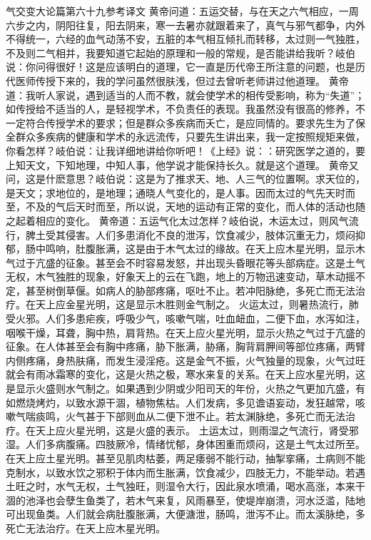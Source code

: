 \documentclass[12pt,UTF8]{ctexbook}
\begin{document}
气交变大论篇第六十九参考译文
黄帝问道：五运交替，与在天之六气相应，一周六步之内，阴阳往复，阳去阴来，寒一去暑亦就跟着来了，真气与邪气都争，内外不得统一，六经的血气动荡不安，五脏的本气相互倾扎而转移，太过则一气独胜，不及则二气相并，我要知道它起始的原理和一般的常规，是否能讲给我听？岐伯说：你问得很好！这是应该明白的道理，它一直是历代帝王所注意的问题，也是历代医师传授下来的，我的学问虽然很肤浅，但过去曾听老师讲过他道理。
黄帝道：我听人家说，遇到适当的人而不教，就会使学术的相传受影响，称为“失道”；如传授给不适当的人，是轻视学术，不负责任的表现。我虽然没有很高的修养，不一定符合传授学术的要求；但是群众多疾病而夭亡，是应同情的。要求先生为了保全群众多疾病的健康和学术的永远流传，只要先生讲出来，我一定按照规矩来做，你看怎样？岐伯说：让我详细地讲给你听吧！《上经》说：：研究医学之道的，要上知天文，下知地理，中知人事，他学说才能保持长久。就是这个道理。
黄帝又问，这是什麽意思？岐伯说：这是为了推求天、地、人三气的位置啊。求天位的，是天文；求地位的，是地理；通晓人气变化的，是人事。因而太过的气先天时而至，不及的气后天时而至，所以说，天地的运动有正常的变化，而人体的活动也随之起着相应的变化。
黄帝道：五运气化太过怎样？岐伯说，木运太过，则风气流行，脾土受其侵害。人们多患消化不良的泄泻，饮食减少，肢体沉重无力，烦闷抑郁，肠中鸣响，肚腹胀满，这是由于木气太过的缘故。在天上应木星光明，显示木气过于亢盛的征象。甚至会不时容易发怒，并出现头昏眼花等头部病症。这是土气无权，木气独胜的现象，好象天上的云在飞跑，地上的万物迅速变动，草木动摇不定，甚至树倒草偃。如病人的胁部疼痛，呕吐不止。若冲阳脉绝，多死亡而无法治疗。在天上应金星光明，这是显示木胜则金气制之。
火运太过，则暑热流行，肺受火邪。人们多患疟疾，呼吸少气，咳嗽气喘，吐血衄血，二便下血，水泻如注，咽喉干燥，耳聋，胸中热，肩背热。在天上应火星光明，显示火热之气过于亢盛的征象。在人体甚至会有胸中疼痛，胁下胀满，胁痛，胸背肩胛间等部位疼痛，两臂内侧疼痛，身热肤痛，而发生浸淫疮。这是金气不振，火气独量的现象，火气过旺就会有雨冰霜寒的变化，这是火热之极，寒水来复的关系。在天上应水星光明，这是显示火盛则水气制之。如果遇到少阴或少阳司天的年份，火热之气更加亢盛，有如燃烧烤灼，以致水源干涸，植物焦枯。人们发病，多见谵语妄动，发狂越常，咳嗽气喘痰鸣，火气甚于下部则血从二便下泄不止。若太渊脉绝，多死亡而无法治疗。在天上应火星光明，这是火盛的表示。
土运太过，则雨湿之气流行，肾受邪湿。人们多病腹痛。四肢厥冷，情绪忧郁，身体困重而烦闷，这是土气太过所至。在天上应土星光明。甚至见肌肉枯萎，两足痿弱不能行动，抽掣挛痛，土病则不能克制水，以致水饮之邪积于体内而生胀满，饮食减少，四肢无力，不能举动。若遇土旺之时，水气无权，土气独旺，则湿令大行，因此泉水喷涌，喝水高涨，本来干涸的池泽也会孽生鱼类了，若木气来复，风雨暴至，使堤岸崩溃，河水泛滥，陆地可出现鱼类。人们就会病肚腹胀满，大便溏泄，肠鸣，泄泻不止。而太溪脉绝，多死亡无法治疗。在天上应木星光明。
\end{document}

